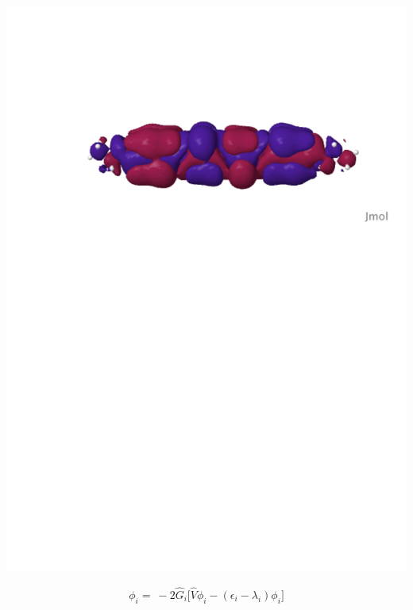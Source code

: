 \documentclass[mathserif, 10pt]{beamer}
\begin{document}
\begin{frame}
\begin{columns}
\begin{column}[b]{0.48\linewidth}
    \includegraphics[scale=0.25, clip, viewport = 80 560 600 700]{figures/can_orb_2.pdf}\\

    \vspace{2mm}

    \begin{equation}
        \nonumber
        \phi_i =\ -2\hat{G}_i\Bigg[\hat{V}\phi_i
        - (\epsilon_i - \lambda_i)\phi_i\Bigg]
    \end{equation}
    \end{column}


\end{columns}
\end{frame}
\end{document}
